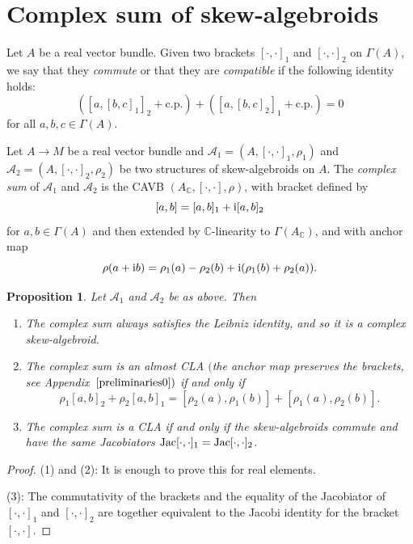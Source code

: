 \documentclass[pdftex]{sigma}
\numberwithin{equation}{section}
\newtheorem{Proposition}[Theorem]{Proposition}
 { \theoremstyle{definition}
\newtheorem{Definition}[Theorem]{Definition}
\newtheorem{Note}[Theorem]{Note}
\newtheorem{Example}[Theorem]{Example}
\newtheorem{Examples}[Theorem]{Examples}
\newtheorem{Remark}[Theorem]{Remark} }
\newcommand{\C}{{\mathbb{C}}}
\begin{document}
\section{Complex sum of skew-algebroids}\label{cxsum}
Let $A$ be a real vector bundle. Given two brackets $[\cdot,\cdot]_1$ and $[\cdot,\cdot]_2$ on $\Gamma(A)$, we say that they {\em commute} or that they are {\em compatible} if the following identity holds:
\begin{equation}\label{commute_id}
  ([a,[b,c]_1]_2+\mathrm{c.p.})+([a,[b,c]_2]_1+\mathrm{c.p.})=0
\end{equation}
for all $a,b,c\in \Gamma(A)$.
\begin{Definition}
Let $A\to M$ be a real vector bundle and $\mathcal{A}_1=(A,[\cdot,\cdot]_1, \rho_1)$ and $\mathcal{A}_2=(A,[\cdot,\cdot]_2, \rho_2)$ be two structures of skew-algebroids on $A$. The {\em complex sum} of $\mathcal{A}_1$ and $\mathcal{A}_2$ is the CAVB $(A_{\C}, [\cdot,\cdot], \rho)$, with bracket defined by
\[[a,b]=[a,b]_1+{\rm i}[a,b]_2\]
 for $a,b \in \Gamma(A)$ and then extended by $\C$-linearity to $\Gamma(A_{\C})$, and with anchor map
 \[\rho(a+{\rm i}b)=\rho_1(a)-\rho_2(b)+{\rm i}(\rho_1(b)+\rho_2(a)).\]
\end{Definition}
\begin{Proposition}\label{properties_cxsum}
Let $\mathcal{A}_1$ and $\mathcal{A}_2$ be as above. Then
\begin{enumerate}\itemsep=0pt
\item[$1.$] The complex sum always satisfies the Leibniz identity, and so it is a complex skew-algebroid.
   \item[$2.$] The complex sum is an almost CLA $($the anchor map preserves the brackets, see Appendix~$\ref{preliminaries0})$ if and only if
  \[\rho_1[a,b]_2+\rho_2[a,b]_1=[\rho_2(a),\rho_1(b)]+[\rho_1(a), \rho_2(b)].\]
   \item[$3.$] The complex sum is a CLA if and only if the skew-algebroids commute and have the same Jacobiators ${\rm Jac}[\cdot,\cdot]_1={\rm Jac}[\cdot,\cdot]_2$.
\end{enumerate}
\end{Proposition}
\begin{proof}
(1) and (2): It is enough to prove this for real elements.

(3): The commutativity of the brackets and the equality of the Jacobiator of $[\cdot,\cdot]_1$ and $[\cdot,\cdot]_2$ are together equivalent to the Jacobi identity for the bracket $[\cdot,\cdot]$.
\end{proof}
\end{document}

